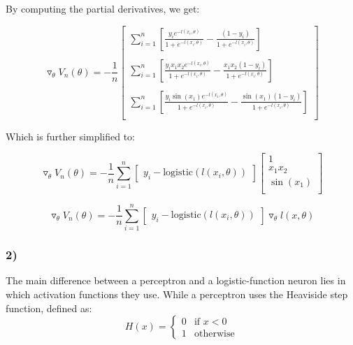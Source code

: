 \documentclass[12pt,a4paper]{article}
\begin{document}
By computing the partial derivatives, we get:

\begin{equation*}
\triangledown_\theta V_n(\theta) 
=
-\frac{1}{n}
\begin{bmatrix}
    \sum_{i=1}^n [ \frac{y_i e^{-l(x_i,\theta)}}{1+e^{-l(x_i,\theta)}} - \frac{(1-y_i)}{1+e^{-l(x_i,\theta)}} ] \\\\
    \sum_{i=1}^n [ \frac{y_i x_1 x_ 2 e^{-l(x_i,\theta)}}{1+e^{-l(x_i,\theta)}} - \frac{x_1x_2(1-y_i)}{1+e^{-l(x_i,\theta)}} ] \\\\
    \sum_{i=1}^n [ \frac{y_i \sin(x_1) e^{-l(x_i,\theta)}}{1+e^{-l(x_i,\theta)}} - \frac{\sin(x_1)(1-y_i)}{1+e^{-l(x_i,\theta)}} ] \\
\end{bmatrix}
\end{equation*}

Which is further simplified to:

\begin{equation*}
\triangledown_\theta V_n(\theta) 
=
-\frac{1}{n}
\displaystyle \sum_{i=1}^n
\begin{bmatrix}
	y_i - \text{logistic}(l(x_i,\theta))
\end{bmatrix}
\begin{bmatrix}
    1\\
    x_1x_2\\
    \sin(x_1)\\
\end{bmatrix}
\end{equation*}

\begin{equation*}
\triangledown_\theta V_n(\theta) 
=
-\frac{1}{n}
\displaystyle \sum_{i=1}^n
\begin{bmatrix}
	y_i - \text{logistic}(l(x_i,\theta))
\end{bmatrix}
\triangledown_\theta l(x,\theta)
\end{equation*}

\subsubsection*{2)}

The main difference between a perceptron and a logistic-function neuron lies in which activation functions they use. While a perceptron uses the Heaviside step function, defined as:
\begin{equation*}
H(x) = 
\begin{cases}
    0 & \text{if $x < 0$}\\
    1 & \text{otherwise}
\end{cases}
\end{equation*}
\end{document}
